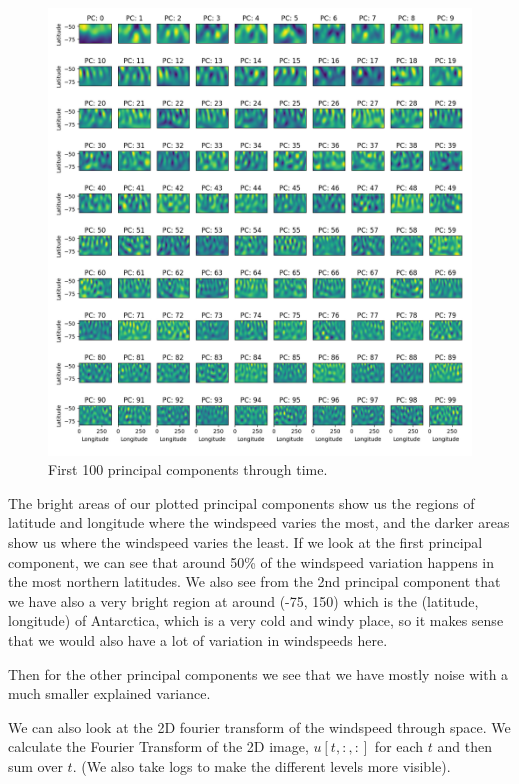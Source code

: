 \documentclass[a4paper, oneside]{book}
\begin{document}
\begin{figure}[htpb]
    \centering
    \includegraphics[width=1.0\textwidth]{./images/first_81_pc_through_time.png}
    \caption{First 100 principal components through time.}
\end{figure}

The bright areas of our plotted principal components show us the regions of latitude and longitude
where the windspeed varies the most, and the darker areas show us where the windspeed varies the least.
If we look at the first principal component, we can see that around 50\% of the windspeed
variation happens in the most northern latitudes. We also see from the 2nd principal component
that we have also a very bright region at around (-75, 150) which is the (latitude, longitude) of Antarctica,
which is a very cold and windy place, so it makes sense that we would also have a lot of variation in windspeeds here.

Then for the other principal components we see that we have mostly noise with a much smaller
explained variance.


\clearpage


We can also look at the 2D fourier transform of the windspeed through space.
We calculate the Fourier Transform of the 2D image, $u[t, :, :]$ for each $t$ and then
sum over $t$. (We also take logs to make the different levels more visible).
\end{document}
